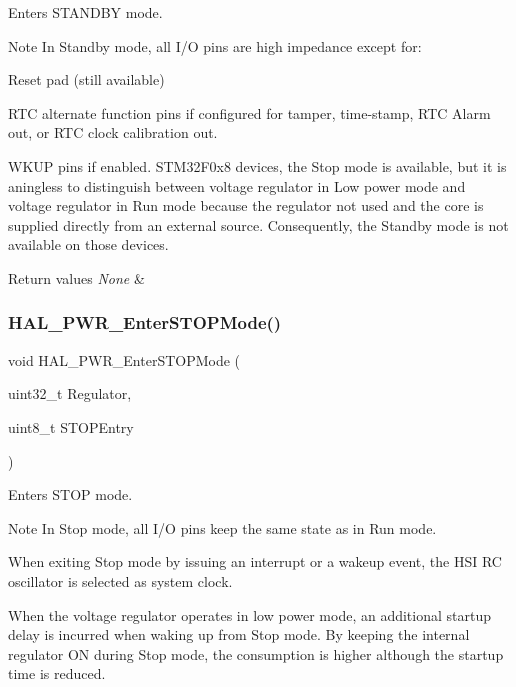 Enters S\+T\+A\+N\+D\+BY mode. 

\begin{DoxyNote}{Note}
In Standby mode, all I/O pins are high impedance except for\+:
\begin{DoxyItemize}
\item Reset pad (still available)
\item R\+TC alternate function pins if configured for tamper, time-\/stamp, R\+TC Alarm out, or R\+TC clock calibration out.
\item W\+K\+UP pins if enabled. S\+T\+M32\+F0x8 devices, the Stop mode is available, but it is aningless to distinguish between voltage regulator in Low power mode and voltage regulator in Run mode because the regulator not used and the core is supplied directly from an external source. Consequently, the Standby mode is not available on those devices. 
\end{DoxyItemize}
\end{DoxyNote}

\begin{DoxyRetVals}{Return values}
{\em None} & \\
\hline
\end{DoxyRetVals}
\mbox{\label{group___p_w_r___exported___functions___group2_gacfca5f1062274423e08317c0a5a225fa}} 
\subsubsection{\texorpdfstring{H\+A\+L\+\_\+\+P\+W\+R\+\_\+\+Enter\+S\+T\+O\+P\+Mode()}{HAL\_PWR\_EnterSTOPMode()}}
{\footnotesize\ttfamily void H\+A\+L\+\_\+\+P\+W\+R\+\_\+\+Enter\+S\+T\+O\+P\+Mode (\begin{DoxyParamCaption}\item[{uint32\+\_\+t}]{Regulator,  }\item[{uint8\+\_\+t}]{S\+T\+O\+P\+Entry }\end{DoxyParamCaption})}



Enters S\+T\+OP mode. 

\begin{DoxyNote}{Note}
In Stop mode, all I/O pins keep the same state as in Run mode. 

When exiting Stop mode by issuing an interrupt or a wakeup event, the H\+SI RC oscillator is selected as system clock. 

When the voltage regulator operates in low power mode, an additional startup delay is incurred when waking up from Stop mode. By keeping the internal regulator ON during Stop mode, the consumption is higher although the startup time is reduced. 
\end{DoxyNote}

